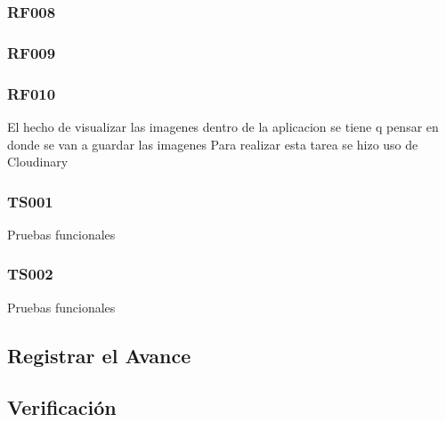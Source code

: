 \subsubsection{RF008}
\label{subs:RF008}

\subsubsection{RF009}
\label{subs:RF009}

\subsubsection{RF010}
\label{subs:RF010}
 El hecho de visualizar las imagenes dentro de la aplicacion se tiene q pensar en donde se van a guardar las imagenes
 Para realizar esta tarea se hizo uso de Cloudinary

\subsubsection{TS001}
\label{subs:TS001}

Pruebas funcionales


\subsubsection{TS002}
\label{subs:TS002}

Pruebas funcionales

\subsection{Registrar el Avance}
\label{sub:iteracion1_avance}

\subsection{Verificación}
\label{sub:iteracion1_verificacion}
